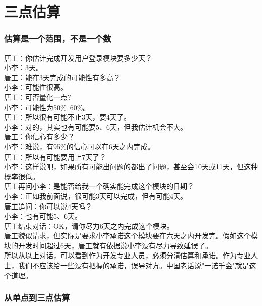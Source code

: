 \chapter{三点估算} %

\hypertarget{ux4f30ux7b97ux662fux4e00ux4e2aux8303ux56f4ux4e0dux662fux4e00ux4e2aux6570}{%
\subsection{估算是一个范围，不是一个数}\label{ux4f30ux7b97ux662fux4e00ux4e2aux8303ux56f4ux4e0dux662fux4e00ux4e2aux6570}}

唐工：你估计完成开发用户登录模块要多少天？\\
小李：3天。\\
唐工：能在3天完成的可能性有多高？\\
小李：可能性很高。\\
唐工：可否量化一点?\\
小李：可能性为50\%~60\%。\\
唐工：所以很有可能不止3天，要4天了。\\
小李：对的，其实也有可能要5、6天，但我估计机会不大。\\
唐工：你信心有多少？\\
小李：难说，有95\%的信心可以在6天之内完成。\\
唐工：所以有可能要用上7天了？\\
小李：这样说吧，如果所有可能出问题的都出了问题，甚至会10天或11天，但这种概率很低。\\
唐工再问小李：是能否给我一个确实能完成这个模块的日期？\\
小李：正如我前面说，很可能3天可以完成，但有可能4天。\\
唐工追问：你可以说4天吗？\\
小李：也有可能5、6天。\\
唐工结束对话：OK，请你尽力6天之内完成这个模块。\\
唐工貌似请求，但实际是要求小李承诺这个模块要在六天之内开发完。假如这个模块的开发时间超过6天，唐工就有依据说小李没有尽力导致延误了。\\
所以从以上对话，可以看到作为开发专业人员，必须分清估算和承诺。作为专业人士，我们不应该给一些没有把握的承诺，误导对方。中国老话说"一诺千金"就是这个道理。

\hypertarget{ux4eceux5355ux70b9ux5230ux4e09ux70b9ux4f30ux7b97}{%
\subsection{从单点到三点估算}\label{ux4eceux5355ux70b9ux5230ux4e09ux70b9ux4f30ux7b97}}

